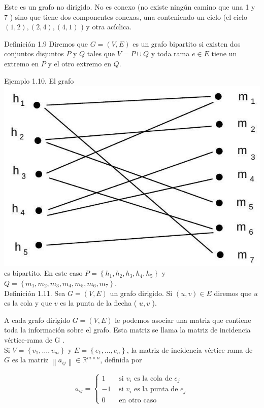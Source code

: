 \documentclass[10pt]{article}
\begin{document}
Este es un grafo no dirigido. No es conexo (no existe ningún camino que una 1 y 7 ) sino que tiene dos componentes conexas, una conteniendo un ciclo (el ciclo $(1,2),(2,4),(4,1)$ ) y otra acíclica.

Definición 1.9 Diremos que $G=(V, E)$ es un grafo bipartito si existen dos conjuntos disjuntos $P$ y $Q$ tales que $V=P \cup Q$ y toda rama $e \in E$ tiene un extremo en $P$ y el otro extremo en $Q$.

Ejemplo 1.10. El grafo\\
\includegraphics[max width=\textwidth, center]{2025_09_05_93c7c1835f249f70c0eeg-03(1)}\\
es bipartito. En este caso $P=\left\{h_{1}, h_{2}, h_{3}, h_{4}, h_{5}\right\}$ y $Q=\left\{m_{1}, m_{2}, m_{3}, m_{4}, m_{5}, m_{6}, m_{7}\right\}$.\\
Definición 1.11. Sea $G=(V, E)$ un grafo dirigido. Si $(u, v) \in E$ diremos que $u$ es la cola y que $v$ es la punta de la flecha ( $u, v$ ).

A cada grafo dirigido $G=(V, E)$ le podemos asociar una matriz que contiene toda la información sobre el grafo. Esta matriz se llama la matriz de incidencia vértice-rama de G .\\
Si $V=\left\{v_{1}, \ldots, v_{m}\right\}$ y $E=\left\{e_{1}, \ldots, e_{n}\right\}$, la matriz de incidencia vértice-rama de $G$ es la matriz $\left\|a_{i j}\right\| \in \mathbb{R}^{m \times n}$, definida por

$$
a_{i j}= \begin{cases}1 & \text { si } v_{i} \text { es la cola de } e_{j} \\ -1 & \text { si } v_{i} \text { es la punta de } e_{j} \\ 0 & \text { en otro caso }\end{cases}
$$
\end{document}

